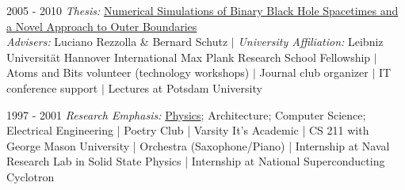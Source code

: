 \documentclass[]{seiler-resume}
\begin{document}
\begin{entrylist}
{2005 - 2010}{ {\small \textit{Thesis:} \href{http://jennseiler.com/docs/thesis.pdf}{Numerical Simulations of Binary Black Hole Spacetimes and a Novel Approach to Outer Boundaries}}\\
\textit{Advisers:} Luciano Rezzolla \& Bernard Schutz $\vert$
\textit{University Affiliation:} Leibniz Universit\"{a}t Hannover International Max Plank Research School Fellowship $\vert$ Atoms and Bits volunteer (technology workshops) $\vert$ Journal club organizer $\vert$ IT conference support $\vert$ Lectures at Potsdam University}


 {1997 - 2001}
{\textit{Research Emphasis:} \href{https://www.washingtonpost.com/archive/local/2000/12/21/honors-and-awards/22049aac-b3e7-4112-8874-317d7f1ed3a0/}{Physics}; Architecture; Computer Science; Electrical Engineering | Poetry Club | Varsity It's Academic | CS 211 with George Mason University | Orchestra (Saxophone/Piano) | Internship at Naval Research Lab in Solid State Physics | Internship at National Superconducting Cyclotron }
\end{entrylist}
\end{document}
